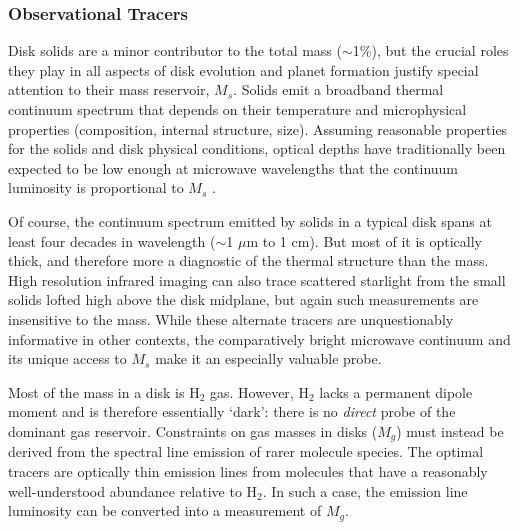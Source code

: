 \documentclass[a4paper]{ar-1col}
\begin{document}
\subsubsection{Observational Tracers}
Disk solids are a minor contributor to the total mass ($\sim$1\%), but the crucial roles they play in all aspects of disk evolution and planet formation justify special attention to their mass reservoir, $M_s$.  Solids emit a broadband thermal continuum spectrum that depends on their temperature and microphysical properties (composition, internal structure, size).  Assuming reasonable properties for the solids and disk physical conditions, optical depths have traditionally been expected to be low enough at microwave wavelengths that the continuum luminosity is proportional to $M_s$ \citep{beckwith90}.  
\begin{marginnote}[]
\end{marginnote}

Of course, the continuum spectrum emitted by solids in a typical disk spans at least four decades in wavelength ($\sim$1 $\mu$m to 1 cm).  But most of it is optically thick, and therefore more a diagnostic of the thermal structure than the mass.  High resolution infrared imaging can also trace scattered starlight from the small solids lofted high above the disk midplane, but again such measurements are insensitive to the mass.  While these alternate tracers are unquestionably informative in other contexts, the comparatively bright microwave continuum and its unique access to $M_s$ make it an especially valuable probe.            

Most of the mass in a disk is H$_2$ gas.  However, H$_2$ lacks a permanent dipole moment and is therefore essentially `dark': there is no {\it direct} probe of the dominant gas reservoir.  Constraints on gas masses in disks ($M_g$) must instead be derived from the spectral line emission of rarer molecule species.  The optimal tracers are optically thin emission lines from molecules that have a reasonably well-understood abundance relative to H$_2$.  In such a case, the emission line luminosity can be converted into a measurement of $M_g$.
\end{document}
